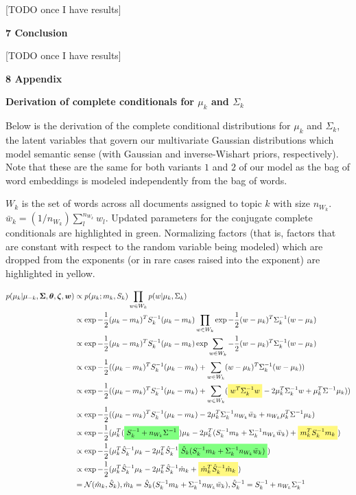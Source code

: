 \documentclass[12pt]{article}
\newcommand{\ghighlight}[1]{%
  \colorbox{green!50}{$\displaystyle#1$}}
\newcommand{\yhighlight}[1]{%
  \colorbox{yellow!50}{$\displaystyle#1$}}
\begin{document}
[TODO once I have results]

\textbf{7 Conclusion}

[TODO once I have results]

\textbf{8 Appendix}

\textbf{Derivation of complete conditionals for $\mu_k$ and $\Sigma_k$}

Below is the derivation of the complete conditional distributions for $\mu_k$ and $\Sigma_k$, the latent variables that govern our multivariate Gaussian distributions which model semantic sense (with Gaussian and inverse-Wishart priors, respectively).  Note that these are the same for both variants $1$ and $2$ of our model as the bag of word embeddings is modeled independently from the bag of words.

$W_k$ is the set of words across all documents assigned to topic $k$ with size $n_{W_k}$.  $\bar{w}_k = (1/n_{W_k})\sum^{n_{W_k}}_l w_l$.  Updated parameters for the conjugate complete conditionals are highlighted in green.  Normalizing factors (that is, factors that are constant with respect to the random variable being modeled) which are dropped from the exponents (or in rare cases raised into the exponent) are highlighted in yellow.

\begin{align*}
p(\mu_k | \mu_{-k}, \bm{\Sigma}, \bm{\theta}, \bm{\zeta}, \bm{w}) & \propto p(\mu_k; m_k, S_k) \prod_{w \in W_k} p(w | \mu_k, \Sigma_k) \\
& \propto \exp{-\frac{1}{2}(\mu_k - m_k)^T S_k^{-1} (\mu_k - m_k)} \prod_{w \in W_k} \exp{-\frac{1}{2}(w - \mu_k)^T \Sigma_k^{-1} (w - \mu_k)} \\
& \propto \exp{-\frac{1}{2}(\mu_k - m_k)^T S_k^{-1} (\mu_k - m_k)} \exp{\sum_{w \in W_k} -\frac{1}{2}(w - \mu_k)^T \Sigma_k^{-1} (w - \mu_k)} \\
& \propto \exp{-\frac{1}{2}((\mu_k - m_k)^T S_k^{-1} (\mu_k - m_k) + \sum_{w \in W_k} (w - \mu_k)^T \Sigma_k^{-1} (w - \mu_k))} \\
& \propto \exp{-\frac{1}{2}((\mu_k - m_k)^T S_k^{-1} (\mu_k - m_k) + \sum_{w \in W_k}(\yhighlight{w^T\Sigma_k^{-1}w} - 2 \mu_k^T\Sigma_k^{-1}w + \mu_k^T\Sigma^{-1}\mu_k))} \\
& \propto \exp{-\frac{1}{2}((\mu_k - m_k)^T S_k^{-1} (\mu_k - m_k) - 2 \mu_k^T\Sigma_k^{-1}n_{W_k}\bar{w}_k + n_{W_k}\mu_k^T\Sigma^{-1}\mu_k)} \\
& \propto \exp{-\frac{1}{2}(\mu_k^T(\ghighlight{S_k^{-1} + n_{W_k}\Sigma^{-1}})\mu_k - 2\mu_k^T(S_k^{-1}m_k + \Sigma_k^{-1}n_{W_k}\bar{w}_k) + \yhighlight{m_k^TS_k^{-1}m_k})} \\
& \propto \exp{-\frac{1}{2}(\mu_k^T\hat{S}_k^{-1}\mu_k - 2\mu_k^T\hat{S}_k^{-1}\ghighlight{\hat{S}_k(S_k^{-1}m_k + \Sigma_k^{-1}n_{W_k}\bar{w}_k)})} \\
& \propto \exp{-\frac{1}{2}(\mu_k^T\hat{S}_k^{-1}\mu_k - 2\mu_k^T\hat{S}_k^{-1}\hat{m}_k + \yhighlight{\hat{m}_k^T\hat{S}_k^{-1}\hat{m}_k})} \\
& = \mathcal{N}(\hat{m}_k, \hat{S}_k), \hat{m}_k = \hat{S}_k(S_k^{-1}m_k + \Sigma_k^{-1}n_{W_k}\bar{w}_k), \hat{S}_k^{-1} = S_k^{-1} + n_{W_k}\Sigma_k^{-1}
\end{align*}
\end{document}

